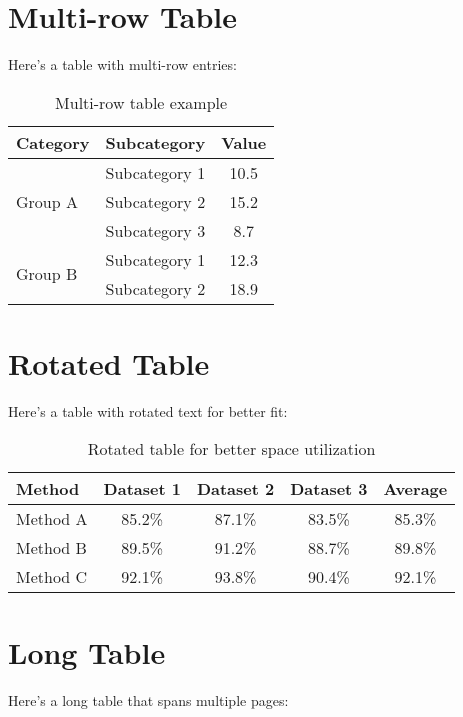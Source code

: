 \documentclass{article}
\begin{document}
\section{Multi-row Table}
Here's a table with multi-row entries:

\begin{table}[h]
\centering
\begin{tabular}{|l|c|c|}
\hline
\textbf{Category} & \textbf{Subcategory} & \textbf{Value} \\
\hline
\multirow{3}{*}{Group A} & Subcategory 1 & 10.5 \\
& Subcategory 2 & 15.2 \\
& Subcategory 3 & 8.7 \\
\hline
\multirow{2}{*}{Group B} & Subcategory 1 & 12.3 \\
& Subcategory 2 & 18.9 \\
\hline
\end{tabular}
\caption{Multi-row table example}
\label{tab:multirow}
\end{table}

\section{Rotated Table}
Here's a table with rotated text for better fit:

\begin{table}[h]
\centering
\begin{sideways}
\begin{tabular}{|l|c|c|c|c|}
\hline
\textbf{Method} & \textbf{Dataset 1} & \textbf{Dataset 2} & \textbf{Dataset 3} & \textbf{Average} \\
\hline
Method A & 85.2\% & 87.1\% & 83.5\% & 85.3\% \\
Method B & 89.5\% & 91.2\% & 88.7\% & 89.8\% \\
Method C & 92.1\% & 93.8\% & 90.4\% & 92.1\% \\
\hline
\end{tabular}
\end{sideways}
\caption{Rotated table for better space utilization}
\label{tab:rotated}
\end{table}

\section{Long Table}
Here's a long table that spans multiple pages:
\end{document}
